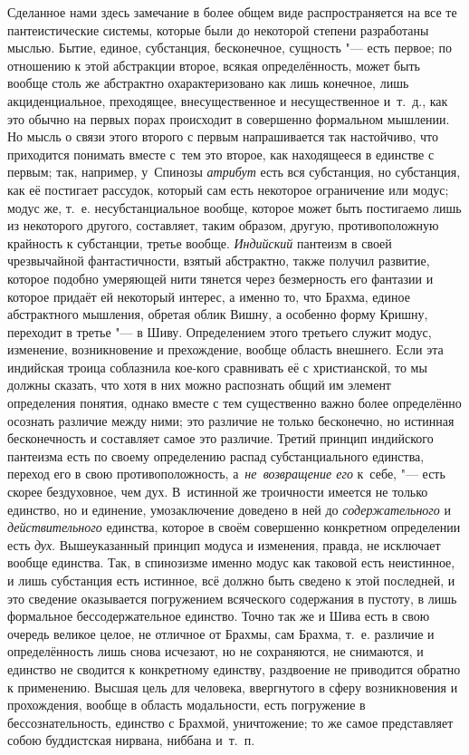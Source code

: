Сделанное нами здесь замечание в более общем виде распространяется на все те
пантеистические системы, которые были до некоторой степени разработаны мыслью.
Бытие, единое, субстанция, бесконечное, сущность "--- есть первое; по отношению
к этой абстракции второе, всякая определённость, может быть вообще столь же
абстрактно охарактеризовано как лишь конечное, лишь акциденциальное,
преходящее, внесущественное и несущественное и~т.~д., как это обычно на первых
порах происходит в совершенно формальном мышлении. Но мысль о связи этого
второго с первым напрашивается так настойчиво, что приходится понимать вместе
с~тем это второе, как находящееся в единстве с первым; так, например, у~Спинозы
{\em атрибут} есть вся субстанция, но субстанция, как её постигает рассудок,
который сам есть некоторое ограничение или модус; модус же, т.~е.
несубстанциальное вообще, которое может быть постигаемо лишь из некоторого
другого, составляет, таким образом, другую, противоположную крайность к
субстанции, третье вообще. {\em Индийский} пантеизм в своей чрезвычайной
фантастичности, взятый абстрактно, также получил развитие, которое подобно
умеряющей нити тянется через безмерность его фантазии и которое придаёт ей
некоторый интерес, а именно то, что Брахма, единое абстрактного мышления,
обретая облик Вишну, а особенно форму Кришну, переходит в третье "---
в Шиву. Определением этого третьего служит модус, изменение, возникновение и
прехождение, вообще область внешнего. Если эта индийская троица соблазнила
кое-кого сравнивать её с христианской, то мы должны сказать, что хотя в них
можно распознать общий им элемент определения понятия, однако вместе с тем
существенно важно более определённо осознать различие между ними; это различие
не только бесконечно, но истинная бесконечность и составляет самое это
различие. Третий принцип индийского пантеизма есть по своему определению распад
субстанциального единства, переход его в свою противоположность,
а~{\em не~возвращение его} к~себе, "--- есть скорее бездуховное, чем дух.
В~истинной же троичности имеется не только единство, но и единение,
умозаключение доведено в ней до {\em содержательного} и {\em действительного}
единства, которое в своём совершенно конкретном определении есть {\em дух}.
Вышеуказанный принцип модуса и изменения, правда, не исключает вообще единства.
Так, в спинозизме именно модус как таковой есть неистинное, и лишь субстанция
есть истинное, всё должно быть сведено к этой последней, и это сведение
оказывается погружением всяческого содержания в пустоту, в лишь формальное
бессодержательное единство. Точно так же и Шива есть в свою очередь великое
целое, не отличное от Брахмы, сам Брахма, т.~е. различие и определённость лишь
снова исчезают, но не сохраняются, не снимаются, и единство не сводится к
конкретному единству, раздвоение не приводится обратно к применению. Высшая
цель для человека, ввергнутого в сферу возникновения и прохождения, вообще в
область модальности, есть погружение в бессознательность, единство с Брахмой,
уничтожение; то же самое представляет собою буддистская нирвана, ниббана
и~т.~п.


